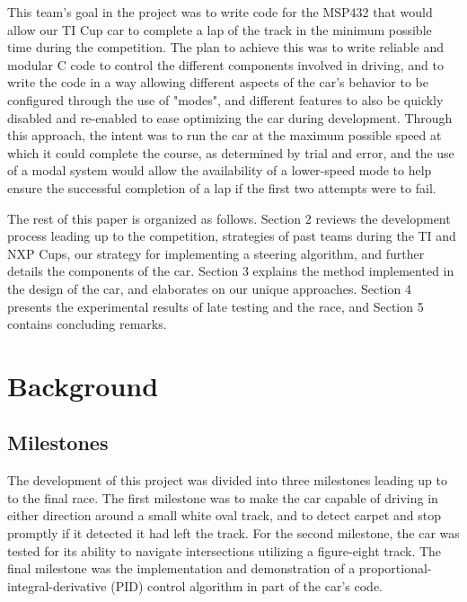 \documentclass{article}
\begin{document}
This team's goal in the project was to write code for the MSP432 that would allow our TI Cup car to complete a lap of the track in the minimum possible time during the competition. The plan to achieve this was to write reliable and modular C code to control the different components involved in driving, and to write the code in a way allowing different aspects of the car's behavior to be configured through the use of "modes", and different features to also be quickly disabled and re-enabled to ease optimizing the car during development. Through this approach, the intent was to run the car at the maximum possible speed at which it could complete the course, as determined by trial and error, and the use of a modal system would allow the availability of a lower-speed mode to help ensure the successful completion of a lap if the first two attempts were to fail.




The rest of this paper is organized as follows. Section 2 reviews the development process leading up to the competition, strategies of past teams during the TI and NXP Cups, our strategy for implementing a steering algorithm, and further details the components of the car. Section 3 explains the method implemented in the design of the car, and elaborates on our unique approaches. Section 4 presents the experimental results of late testing and the race, and Section 5 contains concluding remarks.


\section{Background}
\label{sec:background}

\subsection{Milestones}
The development of this project was divided into three milestones leading up to to the final race. The first milestone was to make the car capable of driving in either direction around a small white oval track, and to detect carpet and stop promptly if it detected it had left the track.  For the second milestone, the car was tested for its ability to navigate intersections utilizing a figure-eight track. The final milestone was the implementation and demonstration of a proportional-integral-derivative (PID) control algorithm in part of the car’s code.
\end{document}
